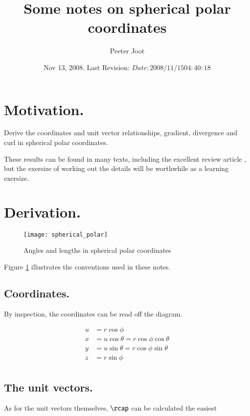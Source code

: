 \documentclass{article}
\title{Some notes on spherical polar coordinates}
\author{Peeter Joot}
\date{ Nov 13, 2008.  Last Revision: $Date: 2008/11/15 04:40:18 $ }
\begin{document}
\maketitle{}

\section{ Motivation. }

Derive the coordinates and unit vector relationships, gradient, divergence and curl in spherical polar coordinates.

These results can be found in many texts, including the excellent review article \cite{fleischCoords}, but 
the exersize of working out the details will be worthwhile as a learning exersize.

\section{ Derivation. }

\begin{figure}[htp]
\centering
\texttt{[image: spherical\_polar]}
\caption{Angles and lengths in spherical polar coordinates}\label{fig:spherical_polar}
\end{figure}

Figure \ref{fig:spherical_polar} illustrates the conventions used in 
these notes.

\subsection{ Coordinates. }

By inspection, the coordinates can be read off the diagram.

\begin{align*}
u &= r \cos\phi \\
x &= u \cos\theta = r \cos\phi \cos\theta \\
y &= u \sin\theta = r \cos\phi \sin\theta \\
z &= r \sin\phi \\
\end{align*}

\subsection{ The unit vectors. }

As for the unit vectors themselves, $\rcap$ can be calculated the easiest
\end{document}

